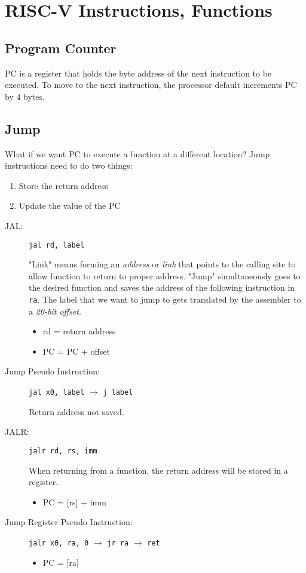 \chapter{RISC-V Instructions, Functions}
\section{Program Counter}
PC is a register that holds the byte address of the next instruction to be executed. To move to the next instruction, the processor default increments PC by 4 bytes.

\section{Jump}
What if we want PC to execute a function at a different location? Jump instructions need to do two things:
\begin{enumerate}
    \item Store the return address
    \item Update the value of the PC
\end{enumerate}

\begin{description}
    \item[JAL:] \texttt{jal rd, label}
    
    "Link" means forming an \emph{address} or \emph{link} that points to the calling site to allow function to return to proper address. "Jump" simultaneously goes to the desired function and saves the address of the following instruction in \texttt{ra}. The label that we want to jump to gets translated by the assembler to a \emph{20-bit offset}.
    \begin{itemize}
        \item rd = return address
        \item PC = PC + offset
    \end{itemize}
    
    \item[Jump Pseudo Instruction:] \texttt{jal x0, label} $\rightarrow$ \texttt{j label}
    
    Return address not saved.
    
    \item[JALR:] \texttt{jalr rd, rs, imm}
    
    When returning from a function, the return address will be stored in a register.
    \begin{itemize}
        \item PC = [rs] + imm
    \end{itemize}
    
    \item[Jump Register Pseudo Instruction:] \texttt{jalr x0, ra, 0} $\rightarrow$ \texttt{jr ra} $\rightarrow$ \texttt{ret}
    
    \begin{itemize}
        \item PC = [ra]
    \end{itemize}
\end{description}

